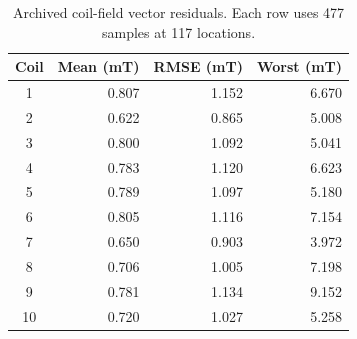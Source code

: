 \begin{table}[t]
\centering
\caption{Archived coil-field vector residuals. Each row uses 477 samples at 117 locations.}
\label{tab:coil field residuals}
\begin{tabular}{crrr}
\toprule
Coil & Mean (mT) & RMSE (mT) & Worst (mT) \\
\midrule
1 & 0.807 & 1.152 & 6.670 \\
2 & 0.622 & 0.865 & 5.008 \\
3 & 0.800 & 1.092 & 5.041 \\
4 & 0.783 & 1.120 & 6.623 \\
5 & 0.789 & 1.097 & 5.180 \\
6 & 0.805 & 1.116 & 7.154 \\
7 & 0.650 & 0.903 & 3.972 \\
8 & 0.706 & 1.005 & 7.198 \\
9 & 0.781 & 1.134 & 9.152 \\
10 & 0.720 & 1.027 & 5.258 \\
\bottomrule
\end{tabular}
\end{table}
